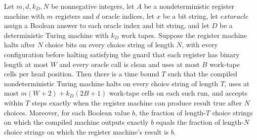 \begin{theorem}
\label{Complexity.LogProg.narm_space_randProb}
\leanok
{}
Let $m,d,k_D,N$ be nonnegative integers, let $A$ be a nondeterministic register
machine with $m$ registers and $d$ oracle indices, let $x$ be a bit string, let
$	ext{oracle}$ assign a Boolean answer to each oracle index and bit string, and let $D$
be a deterministic Turing machine with $k_D$ work tapes. Suppose the register machine
halts after $N$ choice bits on every choice string of length $N$, with every
configuration before halting satisfying the guard that each register has binary length
at most $W$ and every oracle call is clean and uses at most $B$ work-tape cells per head
position. Then there is a time bound $T$ such that the compiled nondeterministic Turing
machine halts on every choice string of length $T$, uses at most $m(W+2)+k_D(2B+1)$
work-tape cells on each such run, and accepts within $T$ steps exactly when the register
machine can produce result true after $N$ choices. Moreover, for each Boolean value $b$,
the fraction of length-$T$ choice strings on which the compiled machine outputs exactly
$b$ equals the fraction of length-$N$ choice strings on which the register machine's
result is $b$.
\end{theorem}
